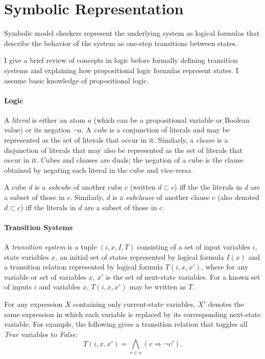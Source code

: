 \documentclass[12pt,a4paper,twoside,openright]{report}
\begin{document}
{\section{Symbolic Representation}
\label{prep:logic}

Symbolic model checkers represent the underlying system as
logical formulas that describe the behavior of the system as one-step transitions
between states. %

I give a brief review of concepts in logic before formally defining transition systems
and explaining how propositional logic formulas represent states.
I assume basic knowledge of propositional logic.

\paragraph{Logic}{
A \emph{literal} is either an atom $a$ (which can
be a propositional variable or Boolean value) or its negation $\neg a$.
A \emph{cube} is a conjunction of literals and may be represented as the set
of literals that occur in it. Similarly, a \emph{clause} is a disjunction of literals that
may also be represented as the set of literals that occur in it.
Cubes and clauses are duals; the negation of a cube is the
clause obtained by negating each literal in the cube
and vice-versa.

A cube $d$ is a \emph{subcube} of another cube $c$ (written $d \subset c$)
iff the the literals in $d$ are a subset of those in $c$.
Similarly, $d$ is a \emph{subclause} of another clause $c$ (also
denoted $d \subset c$) iff the literals in $d$ are a subset of those in $c$.}


\paragraph{Transition Systems}{
A \emph{transition system} is a tuple $(i,x,I,T)$ consisting of a set of input
variables $i$, state variables $x$, an initial
set of states represented by logical formula $I(x)$ and
a transition relation represented by logical formula $T(i,x,x')$,
where for any variable or set of variables $x$, $x'$ is the set of next-state variables. 
For a known set of inputs $i$ and variables $x$, $T(i,x,x')$ may be written
as $T$.

For any expression $X$ containing only current-state variables,
$X'$ denotes the same expression in which each variable is
replaced by its corresponding next-state variable.
For example, the following gives a transition relation that toggles all
{\it True} variables to {\it False}:
$$T(i,x,x') = \bigwedge_{v \in x} (v \Rightarrow \neg v').$$

}}
\end{document}
